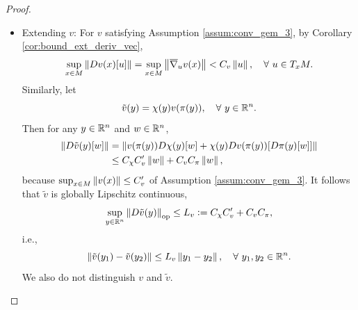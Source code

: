 \begin{proof}
\begin{itemize}
        \item Extending $v$: For $v$ satisfying Assumption \ref{assum:conv_gem_3}, by Corollary \ref{cor:bound_ext_deriv_vec},
        \begin{equation*}
            \sup_{x \in M} \left\lVert Dv(x)[u]\right\lVert =\sup_{x \in M} \left\lVert\overline{\nabla}_uv(x)\right\lVert < C_v\left\lVert u\right\lVert,\quad \forall~u \in T_xM.
        \end{equation*}
        Similarly, let
        \begin{equation*}
            \tilde{v}(y) = \chi(y) v(\pi(y)),\quad \forall ~ y \in \mathbb{R}^n.
        \end{equation*}
        Then for any $y \in \mathbb{R}^n$ and $w \in \mathbb{R}^n$,
        \begin{align*}
            \left\lVert D\tilde{v}(y)[w]\right\lVert &= \left\lVert v(\pi(y))D\chi(y)[w] + \chi(y) D v(\pi(y))[D\pi(y)[w]] \right\lVert \\
            &\leq C_\chi C_v^\prime \left\lVert w\right\lVert + C_v C_\pi\left\lVert w\right\lVert,
        \end{align*}
        because $\sup_{x \in M} \left\lVert v(x)\right\lVert \leq C_v^\prime$ of Assumption \ref{assum:conv_gem_3}. It follows that $\tilde{v}$ is globally Lipschitz continuous,
        \begin{equation*}
            \sup_{y\in \mathbb{R}^n} \left\lVert D\tilde{v}(y)\right\lVert_{\operatorname{op}} \leq L_v \vcentcolon= C_\chi C_v^\prime + C_v C_\pi,
        \end{equation*}
        i.e.,
        \begin{equation*}
            \left\lVert\tilde{v}(y_1) - \tilde{v}(y_2)\right\lVert \leq L_v \left\lVert y_1 - y_2\right\lVert,\quad \forall ~ y_1,y_2 \in \mathbb{R}^n.
        \end{equation*}
        We also do not distinguish $v$ and $\tilde{v}$.


\end{itemize}
\end{proof}
